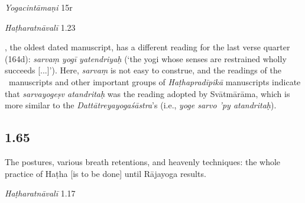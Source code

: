 \begin{ekdosis}
\begin{sources}[hp01_064]
\end{sources}

\begin{testimonia}[hp01_064]
\emph{Yogacintāmaṇi} 15r

\begin{versinnote}
\end{versinnote}

\emph{Haṭharatnāvalī} 1.23

\begin{versinnote}
\end{versinnote}

\end{testimonia}

\begin{philcomm}[hp01_064]
\etaOne, the oldest dated manuscript, has a different reading for the last verse quarter (164d): \emph{sarvaṃ yogī yatendriyaḥ} (`the yogi whose senses are restrained wholly succeeds [...]'). Here, \emph{sarvaṃ} is not easy to construe, and the readings of the \textalpha\ manuscripts and other important groups of \emph{Haṭhapradīpikā} manuscripts indicate that \emph{sarvayogeṣv atandritaḥ} was the reading adopted by Svātmārāma, which is more similar to the \emph{Dattātreyayogaśāstra}'s (i.e., \emph{yoge sarvo 'py atandritaḥ}). 
\end{philcomm}

\subsection*{1.65}
\begin{translation}[hp01_065]
The postures, various breath retentions, and heavenly techniques: the whole practice of Haṭha [is to be done] until Rājayoga results. 
\end{translation}

\begin{sources}[hp01_065]
\end{sources}

\begin{testimonia}[hp01_065]
\emph{Haṭharatnāvalī} 1.17


\end{testimonia}
\end{ekdosis}
